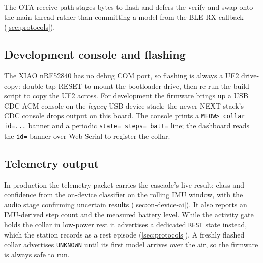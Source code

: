 The OTA receive path stages bytes to flash and defers the verify-and-swap onto the main thread rather
than committing a model from the BLE-RX callback (\cref{sec:protocols}).

\subsection{Development console and flashing}

The XIAO nRF52840 has no debug COM port, so flashing is always a UF2 drive-copy: double-tap RESET to
mount the bootloader drive, then re-run the build script to copy the UF2 across. For development the
firmware brings up a USB CDC ACM console on the \emph{legacy} USB device stack; the newer NEXT stack's
CDC console drops output on this board. The console prints a \texttt{MEOW> collar id=...} banner and a
periodic \texttt{state= steps= batt=} line; the dashboard reads the \texttt{id=} banner over Web
Serial to register the collar.

\subsection{Telemetry output}

In production the telemetry packet carries the cascade's live result: class and confidence from the
on-device classifier on the rolling IMU window, with the audio stage confirming uncertain results
(\cref{sec:on-device-ai}). It also reports an IMU-derived step count and the measured battery level.
While the activity gate holds the collar in low-power rest it advertises a dedicated \texttt{REST}
state instead, which the station records as a rest episode (\cref{sec:protocols}).
A freshly flashed collar advertises \texttt{UNKNOWN} until its first model arrives over the air, so
the firmware is always safe to run.
